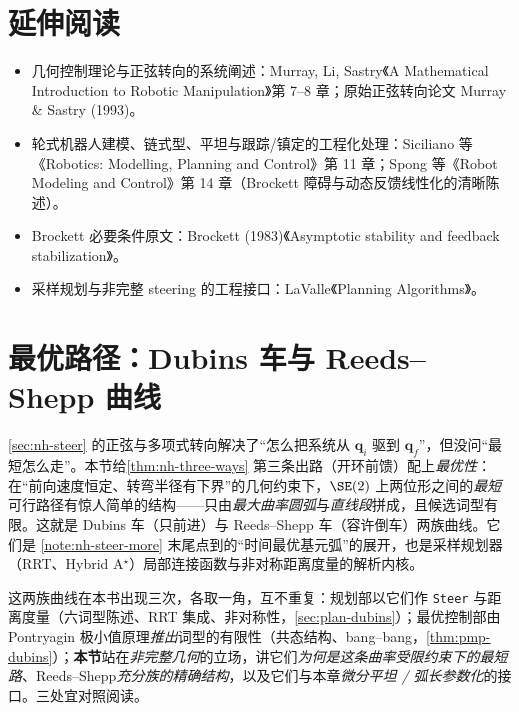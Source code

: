 \section*{延伸阅读}
\begin{itemize}
  \item 几何控制理论与正弦转向的系统阐述：Murray, Li, Sastry《A Mathematical Introduction to Robotic Manipulation》第 7--8 章\cite{murray1994mathematical}；原始正弦转向论文 Murray \& Sastry (1993)\cite{murray1993sinusoids}。
  \item 轮式机器人建模、链式型、平坦与跟踪/镇定的工程化处理：Siciliano 等《Robotics: Modelling, Planning and Control》第 11 章\cite{siciliano2009robotics}；Spong 等《Robot Modeling and Control》第 14 章\cite{spong2006robot}（Brockett 障碍与动态反馈线性化的清晰陈述）。
  \item Brockett 必要条件原文：Brockett (1983)《Asymptotic stability and feedback stabilization》\cite{brockett1983asymptotic}。
  \item 采样规划与非完整 steering 的工程接口：LaValle《Planning Algorithms》\cite{lavalle2006planning}。
\end{itemize}

\section{最优路径：Dubins 车与 Reeds--Shepp 曲线}
\label{sec:nh-optimal-paths}

\cref{sec:nh-steer} 的正弦与多项式转向解决了“怎么把系统从 $\mathbf{q}_i$ 驱到 $\mathbf{q}_f$”，但没问“最短怎么走”。本节给\cref{thm:nh-three-ways} 第三条出路（开环前馈）配上\emph{最优性}：在“前向速度恒定、转弯半径有下界”的几何约束下，$\SE(2)$ 上两位形之间的\emph{最短}可行路径有惊人简单的结构——只由\emph{最大曲率圆弧}与\emph{直线段}拼成，且候选词型有限。这就是 Dubins 车（只前进）与 Reeds--Shepp 车（容许倒车）两族曲线。它们是 \cref{note:nh-steer-more} 末尾点到的“时间最优基元弧”的展开，也是采样规划器（RRT、Hybrid A$^\star$）局部连接函数与非对称距离度量的解析内核。

\begin{remark}[与已有处理的分工]\label{rem:nh-optpath-scope}
这两族曲线在本书出现三次，各取一角，互不重复：规划部以它们作 \texttt{Steer} 与距离度量（六词型陈述、RRT 集成、非对称性，\cref{sec:plan-dubins}）；最优控制部由 Pontryagin 极小值原理\emph{推出}词型的有限性（共态结构、bang--bang，\cref{thm:pmp-dubins}）；\textbf{本节}站在\emph{非完整几何}的立场，讲它们\emph{为何是这条曲率受限约束下的最短路}、Reeds--Shepp\emph{充分族的精确结构}，以及它们与本章\emph{微分平坦 / 弧长参数化}的接口。三处宜对照阅读。
\end{remark}

